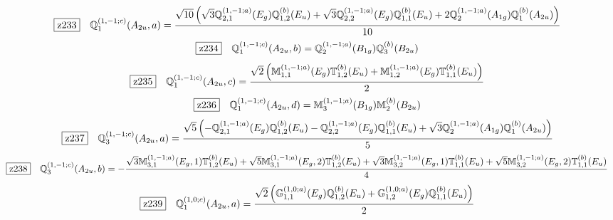 \documentclass[fleqn,10pt,landscape]{jsarticle}
\begin{document}
\begin{dmath*}
\hspace*{3mm}\fbox{z233}\quad \mathbb{Q}_{1}^{(1,-1;c)}(A_{2u},a)=\frac{\sqrt{10} \left(\sqrt{3} \mathbb{Q}_{2,1}^{(1,-1;a)}(E_{g}) \mathbb{Q}_{1,2}^{(b)}(E_{u}) + \sqrt{3} \mathbb{Q}_{2,2}^{(1,-1;a)}(E_{g}) \mathbb{Q}_{1,1}^{(b)}(E_{u}) + 2 \mathbb{Q}_{2}^{(1,-1;a)}(A_{1g}) \mathbb{Q}_{1}^{(b)}(A_{2u})\right)}{10}
\end{dmath*}
\begin{dmath*}
\hspace*{3mm}\fbox{z234}\quad \mathbb{Q}_{1}^{(1,-1;c)}(A_{2u},b)=\mathbb{Q}_{2}^{(1,-1;a)}(B_{1g}) \mathbb{Q}_{3}^{(b)}(B_{2u})
\end{dmath*}
\begin{dmath*}
\hspace*{3mm}\fbox{z235}\quad \mathbb{Q}_{1}^{(1,-1;c)}(A_{2u},c)=\frac{\sqrt{2} \left(\mathbb{M}_{1,1}^{(1,-1;a)}(E_{g}) \mathbb{T}_{1,2}^{(b)}(E_{u}) + \mathbb{M}_{1,2}^{(1,-1;a)}(E_{g}) \mathbb{T}_{1,1}^{(b)}(E_{u})\right)}{2}
\end{dmath*}
\begin{dmath*}
\hspace*{3mm}\fbox{z236}\quad \mathbb{Q}_{1}^{(1,-1;c)}(A_{2u},d)=\mathbb{M}_{3}^{(1,-1;a)}(B_{1g}) \mathbb{M}_{2}^{(b)}(B_{2u})
\end{dmath*}
\begin{dmath*}
\hspace*{3mm}\fbox{z237}\quad \mathbb{Q}_{3}^{(1,-1;c)}(A_{2u},a)=\frac{\sqrt{5} \left(- \mathbb{Q}_{2,1}^{(1,-1;a)}(E_{g}) \mathbb{Q}_{1,2}^{(b)}(E_{u}) - \mathbb{Q}_{2,2}^{(1,-1;a)}(E_{g}) \mathbb{Q}_{1,1}^{(b)}(E_{u}) + \sqrt{3} \mathbb{Q}_{2}^{(1,-1;a)}(A_{1g}) \mathbb{Q}_{1}^{(b)}(A_{2u})\right)}{5}
\end{dmath*}
\begin{dmath*}
\hspace*{3mm}\fbox{z238}\quad \mathbb{Q}_{3}^{(1,-1;c)}(A_{2u},b)=- \frac{\sqrt{3} \mathbb{M}_{3,1}^{(1,-1;a)}(E_{g},1) \mathbb{T}_{1,2}^{(b)}(E_{u}) + \sqrt{5} \mathbb{M}_{3,1}^{(1,-1;a)}(E_{g},2) \mathbb{T}_{1,2}^{(b)}(E_{u}) + \sqrt{3} \mathbb{M}_{3,2}^{(1,-1;a)}(E_{g},1) \mathbb{T}_{1,1}^{(b)}(E_{u}) + \sqrt{5} \mathbb{M}_{3,2}^{(1,-1;a)}(E_{g},2) \mathbb{T}_{1,1}^{(b)}(E_{u})}{4}
\end{dmath*}
\begin{dmath*}
\hspace*{3mm}\fbox{z239}\quad \mathbb{Q}_{1}^{(1,0;c)}(A_{2u},a)=\frac{\sqrt{2} \left(\mathbb{G}_{1,1}^{(1,0;a)}(E_{g}) \mathbb{Q}_{1,2}^{(b)}(E_{u}) + \mathbb{G}_{1,2}^{(1,0;a)}(E_{g}) \mathbb{Q}_{1,1}^{(b)}(E_{u})\right)}{2}
\end{dmath*}
\end{document}
